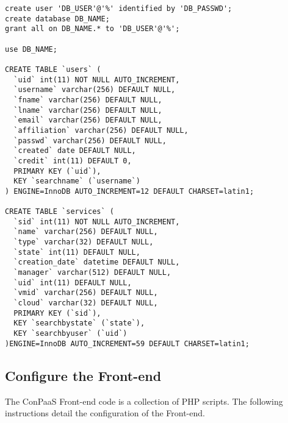 \documentclass[12pt]{article}
\newenvironment{framedbox}[1]%
{\begin{framed}
 \begingroup
 \fontsize{#1}{#1}\selectfont
}
{
 \endgroup
 \end{framed}
}
\begin{document}
\begin{framedbox}{12pt}\begin{verbatim}
create user 'DB_USER'@'%' identified by 'DB_PASSWD';
create database DB_NAME;
grant all on DB_NAME.* to 'DB_USER'@'%';

use DB_NAME;

CREATE TABLE `users` (
  `uid` int(11) NOT NULL AUTO_INCREMENT,
  `username` varchar(256) DEFAULT NULL,
  `fname` varchar(256) DEFAULT NULL,
  `lname` varchar(256) DEFAULT NULL,
  `email` varchar(256) DEFAULT NULL,
  `affiliation` varchar(256) DEFAULT NULL,
  `passwd` varchar(256) DEFAULT NULL,
  `created` date DEFAULT NULL,
  `credit` int(11) DEFAULT 0,
  PRIMARY KEY (`uid`),
  KEY `searchname` (`username`)
) ENGINE=InnoDB AUTO_INCREMENT=12 DEFAULT CHARSET=latin1;

CREATE TABLE `services` (
  `sid` int(11) NOT NULL AUTO_INCREMENT,
  `name` varchar(256) DEFAULT NULL,
  `type` varchar(32) DEFAULT NULL,
  `state` int(11) DEFAULT NULL,
  `creation_date` datetime DEFAULT NULL,
  `manager` varchar(512) DEFAULT NULL,
  `uid` int(11) DEFAULT NULL,
  `vmid` varchar(256) DEFAULT NULL,
  `cloud` varchar(32) DEFAULT NULL,
  PRIMARY KEY (`sid`),
  KEY `searchbystate` (`state`),
  KEY `searchbyuser` (`uid`)
)ENGINE=InnoDB AUTO_INCREMENT=59 DEFAULT CHARSET=latin1;
\end{verbatim}\end{framedbox}

\subsection{Configure the Front-end}
The ConPaaS Front-end code is a collection of PHP scripts. The following
instructions detail the configuration of the Front-end.
\end{document}
